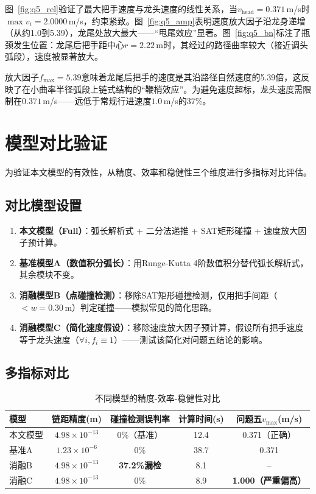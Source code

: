 \documentclass[12pt]{ctexart}
\begin{document}
图~\ref{fig:q5_rel}验证了最大把手速度与龙头速度的线性关系，当$v_{\text{head}}=0.371$\,m/s时$\max v_i = 2.0000$\,m/s，约束紧致。图~\ref{fig:q5_amp}表明速度放大因子沿龙身递增（从约1.0到5.39），龙尾处放大最大——“甩尾效应”显著。图~\ref{fig:q5_bn}标注了瓶颈发生位置：龙尾后把手距中心$r=2.22$\,m时，其经过的路径曲率较大（接近调头弧段），速度被显著放大。

放大因子$f_{\max}=5.39$意味着龙尾后把手的速度是其沿路径自然速度的5.39倍，这反映了在小曲率半径弧段上链式结构的``鞭梢效应''。为避免速度超标，龙头速度需限制在$0.371$\,m/s——远低于常规行进速度$1.0$\,m/s的$37\%$。

\FloatBarrier

\section{模型对比验证}

为验证本文模型的有效性，从精度、效率和稳健性三个维度进行多指标对比评估。

\subsection{对比模型设置}

\begin{enumerate}[label=(\arabic*)]
  \item \textbf{本文模型（Full）}：弧长解析式 + 二分法递推 + SAT矩形碰撞 + 速度放大因子预计算。
  \item \textbf{基准模型A（数值积分弧长）}：用Runge-Kutta 4阶数值积分替代弧长解析式，其余模块不变。
  \item \textbf{消融模型B（点碰撞检测）}：移除SAT矩形碰撞检测，仅用把手间距（$< w=0.30$\,m）判定碰撞——模拟常见的简化思路。
  \item \textbf{消融模型C（简化速度假设）}：移除速度放大因子预计算，假设所有把手速度等于龙头速度（$\forall i, f_i\equiv 1$）——测试该简化对问题五结论的影响。
\end{enumerate}

\subsection{多指标对比}

\begin{table}[htbp]
\centering
\caption{不同模型的精度-效率-稳健性对比}
\label{tab:compare}
\begin{tabular}{lcccc}
\toprule
模型 & 链距精度(m) & 碰撞检测误判率 & 计算时间(s) & 问题五$v_{\max}$(m/s) \\
\midrule
本文模型 & $4.98\times10^{-13}$ & 0\%（基准） & 12.4 & 0.371（正确） \\
基准A & $1.23\times10^{-6}$ & 0\% & 38.7 & 0.371 \\
消融B & $4.98\times10^{-13}$ & \textbf{37.2\%漏检} & 8.1 & -- \\
消融C & $4.98\times10^{-13}$ & 0\% & 8.9 & \textbf{1.000（严重偏高）} \\
\bottomrule
\end{tabular}
\end{table}
\end{document}
